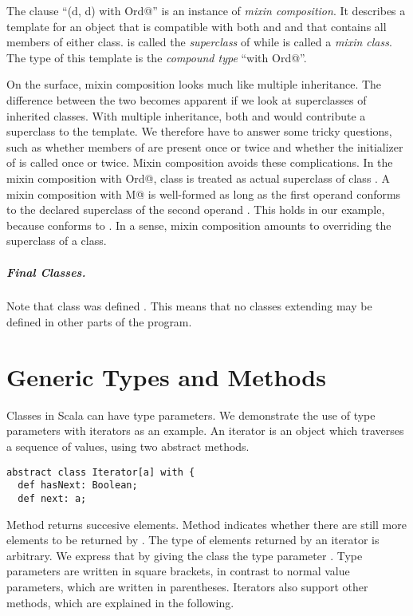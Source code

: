 \documentclass[11pt]{report}
\begin{document}
The clause ``\verb@Rational(d, d) with Ord@'' is an instance of {\em
mixin composition}. It describes a template for an object that is
compatible with both \verb@Rational@ and \verb@Ord@ and that contains
all members of either class. \verb@Rational@ is called the {\em
superclass} of \verb@OrderedRational@ while \verb@Ord@ is called a
{\em mixin class}. The type of this template is the {\em compound
type} ``\verb@Rational with Ord@''.

On the surface, mixin composition looks much like multiple
inheritance. The difference between the two becomes apparent if we
look at superclasses of inherited classes. With multiple inheritance,
both \verb@Rational@ and \verb@Ord@ would contribute a superclass
\verb@Object@ to the template. We therefore have to answer some
tricky questions, such as whether members of \verb@Object@ are present
once or twice and whether the initializer of \verb@Object@ is called
once or twice. Mixin composition avoids these complications.  In the
mixin composition \verb@Rational with Ord@, class
\verb@Rational@ is treated as actual superclass of class \verb@Ord@.
A mixin composition \verb@C with M@ is well-formed as long as the
first operand \verb@C@ conforms to the declared superclass of the
second operand \verb@M@. This holds in our example, because
\verb@Rational@ conforms to \verb@Object@. In a sense, mixin composition
amounts to overriding the superclass of a class.

\paragraph{Final Classes.}
Note that class \verb@OrderedRational@ was defined
\verb@final@. This means that no classes extending \verb@OrderedRational@
may be defined in other parts of the program.


\chapter{Generic Types and Methods}

Classes in Scala can have type parameters. We demonstrate the use of
type parameters with iterators as an example. An iterator is an object
which traverses a sequence of values, using two abstract methods.
\begin{verbatim}
abstract class Iterator[a] with {
  def hasNext: Boolean;
  def next: a;
\end{verbatim}
Method \verb@next@ returns succesive elements.  Method \verb@hasNext@
indicates whether there are still more elements to be returned by
\verb@next@. The type of elements returned by an iterator is
arbitrary. We express that by giving the class \verb@Iterator@ the
type parameter \verb@a@. Type parameters are written in square
brackets, in contrast to normal value parameters, which are written in
parentheses.  Iterators also support other methods, which are
explained in the following.
\end{document}
